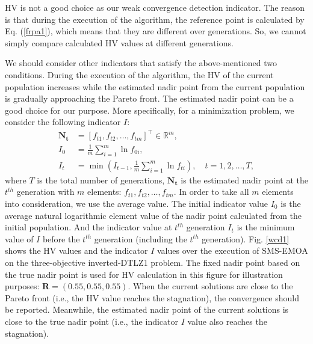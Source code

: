 \documentclass[conference]{IEEEtran}
\begin{document}
HV is not a good choice as our weak convergence detection indicator. 
The reason is that during the execution of the algorithm, the reference point is calculated by Eq. (\ref{frpa1}), 
which means that they are different over generations. 
So, we cannot simply compare calculated HV values at different generations. 

We should consider other indicators that satisfy the above-mentioned two conditions. 
During the execution of the algorithm, the HV of the current population increases 
while the estimated nadir point from the current population is gradually approaching the Pareto front. 
The estimated nadir point can be a good choice for our purpose. 
More specifically,
for a minimization problem, we consider the following indicator $I$:
\begin{equation}\begin{aligned}\label{ewcd1}
  \boldsymbol{N_{t}} &= [f_{t1},f_{t2},\dots,f_{tm}]^\top \in \mathbb{R}^m ,\\
  I_{0} &= \frac{1}{m} \sum_{i=1}^{m} \ln f_{0i},\\
  I_{t} &= \min(I_{t-1},\frac{1}{m} \sum_{i=1}^{m} \ln f_{ti}), \quad
  t = 1,2,\dots,T,
\end{aligned}
\end{equation}
where $T$ is the total number of generations, 
$\boldsymbol{N_{t}}$ is the estimated nadir point at the $t^{th}$ generation with $m$ elements: $f_{t1},f_{t2},\dots,f_{tm}$. 
In order to take all $m$ elements into consideration, we use the average value. 
The initial indicator value $I_0$ is the average natural logarithmic element value of the nadir point calculated from the initial population.
And the indicator value at $t^{th}$ generation $I_t$ is the minimum value of $I$ before the $t^{th}$ generation (including the $t^{th}$ generation). 
Fig. \ref{wcd1} shows the HV values and the indicator $I$ values over the execution of SMS-EMOA 
on the three-objective inverted-DTLZ1 problem. 
The fixed nadir point based on the true nadir point is used for HV calculation in this figure for illustration purposes: $\boldsymbol R = (0.55, 0.55, 0.55)$.
When the current solutions are close to the Pareto front 
(i.e., the HV value reaches the stagnation), the convergence should be reported. 
Meanwhile, the estimated nadir point of the current solutions is close to the true nadir point 
(i.e., the indicator $I$ value also reaches the stagnation). 
 
\end{document}

